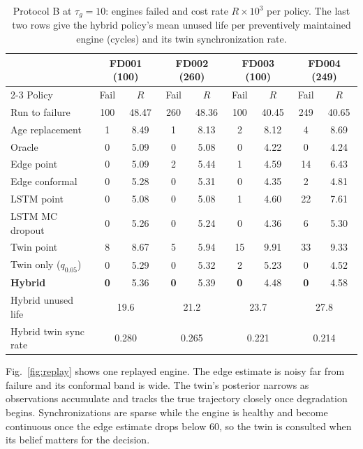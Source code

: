 \documentclass[preprint,12pt,authoryear]{elsarticle}
\newcommand{\botrule}{\bottomrule}
\begin{document}
\begin{table}[t]
\caption{Protocol B at $\tau_g = 10$: engines failed and cost rate $R\times 10^3$ per policy. The last two rows give the hybrid policy's mean unused life per preventively maintained engine (cycles) and its twin synchronization rate.}\label{tab:decisions}
\begin{tabular*}{\textwidth}{@{\extracolsep\fill}lcccccccc}
\toprule
& \multicolumn{2}{c}{FD001 (100)} & \multicolumn{2}{c}{FD002 (260)} & \multicolumn{2}{c}{FD003 (100)} & \multicolumn{2}{c}{FD004 (249)} \\
\cmidrule{2-3}\cmidrule{4-5}\cmidrule{6-7}\cmidrule{8-9}
Policy & Fail & $R$ & Fail & $R$ & Fail & $R$ & Fail & $R$ \\
\midrule
Run to failure      & 100 & 48.47 & 260 & 48.36 & 100 & 40.45 & 249 & 40.65 \\
Age replacement     & 1 & 8.49 & 1 & 8.13 & 2 & 8.12 & 4 & 8.69 \\
Oracle              & 0 & 5.09 & 0 & 5.08 & 0 & 4.22 & 0 & 4.24 \\
\midrule
Edge point          & 0 & 5.09 & 2 & 5.44 & 1 & 4.59 & 14 & 6.43 \\
Edge conformal      & 0 & 5.28 & 0 & 5.31 & 0 & 4.35 & 2 & 4.81 \\
LSTM point          & 0 & 5.08 & 0 & 5.08 & 1 & 4.60 & 22 & 7.61 \\
LSTM MC dropout     & 0 & 5.26 & 0 & 5.24 & 0 & 4.36 & 6 & 5.30 \\
Twin point          & 8 & 8.67 & 5 & 5.94 & 15 & 9.91 & 33 & 9.33 \\
Twin only ($q_{0.05}$) & 0 & 5.29 & 0 & 5.32 & 2 & 5.23 & 0 & 4.52 \\
\textbf{Hybrid}     & \textbf{0} & 5.36 & \textbf{0} & 5.39 & \textbf{0} & 4.48 & \textbf{0} & 4.58 \\
\midrule
Hybrid unused life & \multicolumn{2}{c}{19.6} & \multicolumn{2}{c}{21.2} & \multicolumn{2}{c}{23.7} & \multicolumn{2}{c}{27.8} \\
Hybrid twin sync rate & \multicolumn{2}{c}{0.280} & \multicolumn{2}{c}{0.265} & \multicolumn{2}{c}{0.221} & \multicolumn{2}{c}{0.214} \\
\botrule
\end{tabular*}
\end{table}

Fig.~\ref{fig:replay} shows one replayed engine. The edge estimate is noisy far from failure and its conformal band is wide. The twin's posterior narrows as observations accumulate and tracks the true trajectory closely once degradation begins. Synchronizations are sparse while the engine is healthy and become continuous once the edge estimate drops below 60, so the twin is consulted when its belief matters for the decision.
\end{document}
